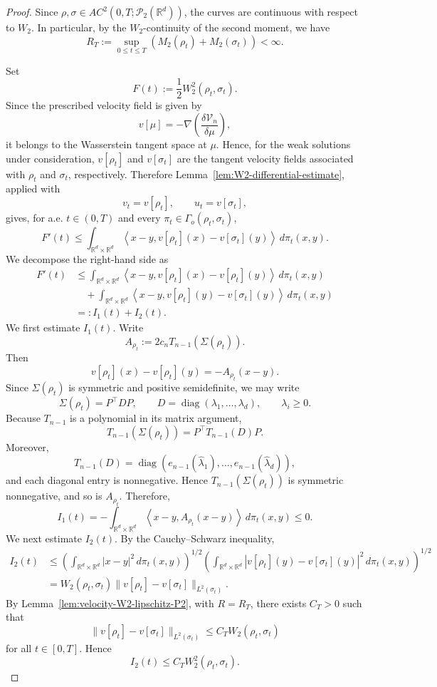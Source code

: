 \documentclass[11pt,reqno]{amsart}
\numberwithin{figure}{section}
\newcommand{\bbr}{\mathbb R}
\newcommand{\dm}{d}
\begin{document}
\begin{proof}
Since $\rho,\sigma\in AC^2(0,T;\mathcal P_2(\mathbb R^d))$, the curves are
continuous with respect to $W_2$. In particular, by the $W_2$-continuity of
the second moment, we have
\[
R_T:=
\sup_{0\le t\le T}
\left(M_2(\rho_t)+M_2(\sigma_t)\right)
<\infty.
\]

Set
\[
F(t):=\frac12W_2^2(\rho_t,\sigma_t).
\]
Since the prescribed velocity field is given by
\[
v[\mu]=-\nabla\left(\frac{\delta\mathcal V_n}{\delta\mu}\right),
\]
it belongs to the Wasserstein tangent space at $\mu$. Hence, for the weak
solutions under consideration, $v[\rho_t]$ and $v[\sigma_t]$ are the tangent
velocity fields associated with $\rho_t$ and $\sigma_t$, respectively.
Therefore Lemma~\ref{lem:W2-differential-estimate}, applied with
\[
v_t=v[\rho_t],
\qquad
u_t=v[\sigma_t],
\]
gives, for a.e. $t\in(0,T)$ and every
$\pi_t\in\Gamma_o(\rho_t,\sigma_t)$,
\[
F'(t)
\le
\int_{\mathbb R^{d}\times\bbr^\dm}
\left\langle x-y,
v[\rho_t](x)-v[\sigma_t](y)
\right\rangle
\,d\pi_t(x,y).
\]
We decompose the right-hand side as
\[
\begin{aligned}
F'(t)
&\le
\int_{\mathbb R^{d}\times\bbr^\dm}
\left\langle x-y,
v[\rho_t](x)-v[\rho_t](y)
\right\rangle\,d\pi_t(x,y) \\
&\quad+
\int_{\mathbb R^{d}\times\bbr^\dm}
\left\langle x-y,
v[\rho_t](y)-v[\sigma_t](y)
\right\rangle\,d\pi_t(x,y) \\
&=:I_1(t)+I_2(t).
\end{aligned}
\]
We first estimate $I_1(t)$. Write
\[
A_{\rho_t}:=2c_nT_{n-1}(\Sigma(\rho_t)).
\]
Then
\[
v[\rho_t](x)-v[\rho_t](y)
=
-A_{\rho_t}(x-y).
\]
Since $\Sigma(\rho_t)$ is symmetric and positive semidefinite, we may write
\[
\Sigma(\rho_t)=P^\top D P,
\qquad
D=\operatorname{diag}(\lambda_1,\dots,\lambda_d),
\qquad
\lambda_i\ge0.
\]
Because $T_{n-1}$ is a polynomial in its matrix argument,
\[
T_{n-1}(\Sigma(\rho_t))
=
P^\top T_{n-1}(D)P.
\]
Moreover,
\[
T_{n-1}(D)
=
\operatorname{diag}
\left(
e_{n-1}(\widehat\lambda_1),
\dots,
e_{n-1}(\widehat\lambda_d)
\right),
\]
and each diagonal entry is nonnegative. Hence
$T_{n-1}(\Sigma(\rho_t))$ is symmetric nonnegative, and so is
$A_{\rho_t}$. Therefore,
\[
I_1(t)
=
-\int_{\mathbb R^{d}\times\bbr^\dm}
\left\langle x-y,A_{\rho_t}(x-y)\right\rangle
\,d\pi_t(x,y)
\le 0.
\]
We next estimate $I_2(t)$. By the Cauchy--Schwarz inequality,
\[
\begin{aligned}
I_2(t)
&\le
\left(\int_{\mathbb R^{d}\times\bbr^\dm} |x-y|^2\,d\pi_t(x,y)\right)^{1/2}
\left(
\int_{\mathbb R^{d}\times\bbr^\dm}
|v[\rho_t](y)-v[\sigma_t](y)|^2\,d\pi_t(x,y)
\right)^{1/2} \\
&=
W_2(\rho_t,\sigma_t)
\|v[\rho_t]-v[\sigma_t]\|_{L^2(\sigma_t)}.
\end{aligned}
\]
By Lemma~\ref{lem:velocity-W2-lipschitz-P2}, with $R=R_T$, there exists
$C_T>0$ such that
\[
\|v[\rho_t]-v[\sigma_t]\|_{L^2(\sigma_t)}
\le
C_TW_2(\rho_t,\sigma_t)
\]
for all $t\in[0,T]$. Hence
\[
I_2(t)
\le
C_TW_2^2(\rho_t,\sigma_t).
\]


\end{proof}
\end{document}

